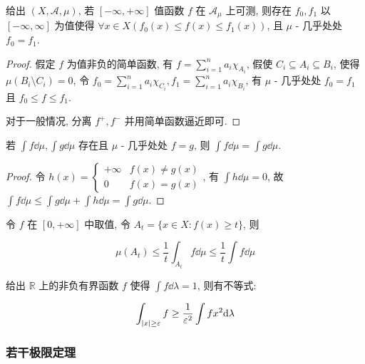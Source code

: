 \begin{lemma}
    给出 \((X,\mathcal{A},\mu)\), 若 \([-\infty,+\infty]\) 值函数 \(f\) 在 \(\mathcal{A}_\mu\) 上可测, 则存在 \(f_0,f_1\) 以 \([-\infty,\infty]\) 为值使得 \(\forall x \in X (f_0(x) \leq f(x) \leq f_1(x))\), 且 \(\mu\) - 几乎处处 \(f_0 = f_1\).

    \begin{proof}
        假定 \(f\) 为值非负的简单函数, 有 \(f = \sum_{i=1}^{n} a_i \chi_{A_i}\), 假使 \(C_i \subseteq A_i \subseteq B_i\), 使得 \(\mu(B_i \setminus C_i) = 0\), 令 \(f_0 = \sum_{i=1}^{n} a_i \chi_{C_i}, f_1 = \sum_{i=1}^{n} a_i \chi_{B_i}\), 有 \(\mu\) - 几乎处处 \(f_0 = f_1\)
        且 \(f_0 \leq f \leq f_1\).

        对于一般情况, 分离 \(f^+,f^-\) 并用简单函数逼近即可.
    \end{proof}
\end{lemma}

\begin{lemma}
    若 \(\int f \dd \mu,\int g \dd \mu\) 存在且 \(\mu\) - 几乎处处 \(f = g\), 则 \(\int f \dd \mu = \int g \dd \mu\).

    \begin{proof}
        令 \(h(x) = \begin{cases}
            + \infty & f(x) \neq g(x) \\
            0 & f(x) = g(x)
        \end{cases}\), 有 \(\int h \dd \mu = 0\), 故 \(\int f \dd \mu \leq \int g \dd \mu + \int h \dd \mu = \int g \dd \mu\).
    \end{proof}
\end{lemma}

\begin{lemma}
    令 \(f\) 在 \([0,+ \infty]\) 中取值, 令 \(A_t = \{x \in X : f(x) \geq t\}\), 则
    
    \[
        \mu (A_t) \leq \frac{1}{t} \int_{A_t} f \dd \mu \leq \frac{1}{t} \int f \dd \mu
    \]
\end{lemma}

\begin{example}
    给出 \(\mathbb{R}\) 上的非负有界函数 \(f\) 使得 \(\int f \dd \lambda = 1\), 则有不等式:

    \[
        \int_{\abs{x} \geq \varepsilon} f \geq \frac{1}{\varepsilon^2} \int f x^2 \dd \lambda
    \]
\end{example}

\subsubsection{若干极限定理}

